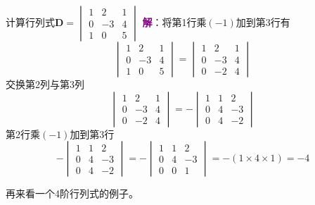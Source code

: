 \begin{example}
	计算行列式$\mathbf{D}=\begin{vmatrix}
		1 & 2 & 1\\
		0 & -3 & 4\\
		1 & 0 & 5
	\end{vmatrix}$
	\tcblower
	\textcolor{purple}{\textbf{解}}：将第1行乘$(-1)$加到第3行有
	$$\begin{vmatrix}
		1 & 2 & 1\\
		0 & -3 & 4\\
		1 & 0 & 5
	\end{vmatrix}=\begin{vmatrix}
		1 & 2 & 1\\
		0 & -3 & 4\\
		0 & -2 & 4
	\end{vmatrix}$$交换第2列与第3列
	$$\begin{vmatrix}
		1 & 2 & 1\\
		0 & -3 & 4\\
		0 & -2 & 4
	\end{vmatrix}=-\begin{vmatrix}
		1 & 1 & 2\\
		0 & 4 & -3\\
		0 & 4 & -2
	\end{vmatrix}$$第2行乘$(-1)$加到第3行$$-\begin{vmatrix}
		1 & 1 & 2\\
		0 & 4 & -3\\
		0 & 4 & -2
	\end{vmatrix}=-\begin{vmatrix}
		1 & 1 & 2\\
		0 & 4 & -3\\
		0 & 0 & 1
	\end{vmatrix}=-\left( 1\times 4 \times 1 \right)=-4$$
\end{example}

再来看一个4阶行列式的例子。

